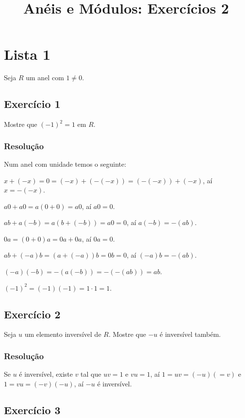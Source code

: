 \documentclass[10pt,a4paper]{article}
\title{Anéis e Módulos: Exercícios 2}
\author{}
\date{}
\begin{document}
\maketitle

\newpage

\section*{Lista 1}

Seja $R$ um anel com $1\neq 0$.

\subsection*{Exercício 1}

Mostre que $(-1)^2=1$ em $R$.

\subsubsection*{Resolução}

Num anel com unidade temos o seguinte:

\medskip
\noindent
$x+(-x)=0=(-x)+(-(-x))=(-(-x))+(-x)$, aí $x=-(-x)$.

\medskip
\noindent
$a0+a0=a(0+0)=a0$, aí $a0=0$.

\medskip
\noindent
$ab+a(-b)=a(b+(-b))=a0=0$, aí $a(-b)=-(ab)$.

\medskip
\noindent
$0a=(0+0)a=0a+0a$, aí $0a=0$.

\medskip
\noindent
$ab+(-a)b=(a+(-a))b=0b=0$, aí $(-a)b=-(ab)$.

\medskip
\noindent
$(-a)(-b)=-(a(-b))=-(-(ab))=ab$.

\medskip
\noindent
$(-1)^2=(-1)(-1)=1\cdot 1=1$.

\subsection*{Exercício 2}

Seja $u$ um elemento inversível de $R$. Mostre que $-u$ é inversível também.

\subsubsection*{Resolução}

Se $u$ é inversível, existe $v$ tal que $uv=1$ e $vu=1$, aí $1=uv=(-u)(=v)$ e $1=vu=(-v)(-u)$, aí $-u$ é inversível.

\subsection*{Exercício 3}
\end{document}

